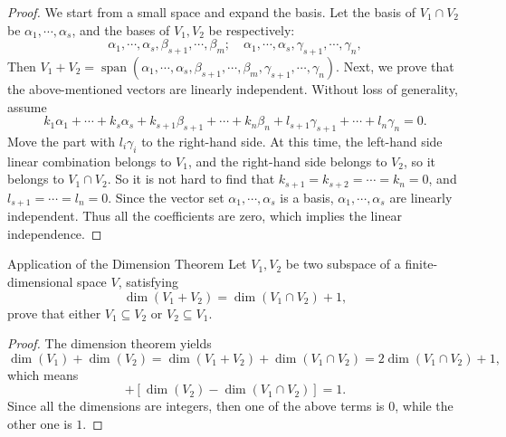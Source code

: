 \begin{proof}
  We start from a small space and expand the basis.
  Let the basis of $V_1 \cap V_2$ be $\alpha_1,\cdots,\alpha_s$,
  and the bases of $V_1, V_2$ be respectively:
  \begin{equation}
    \alpha_1,\cdots,\alpha_s,\beta_{s+1},\cdots,\beta_m; \quad 
    \alpha_1,\cdots,\alpha_s,\gamma_{s+1},\cdots,\gamma_n,
  \end{equation}
  Then $V_1 + V_2 = \operatorname{span}(\alpha_1,\cdots,\alpha_s,\beta_{s+1},\cdots,\beta_m,\gamma_{s+1},\cdots,\gamma_n)$.
  Next, we prove that the above-mentioned vectors are linearly independent.
  Without loss of generality, assume
  \begin{equation}
    k_1\alpha_1+\cdots+k_s\alpha_s+k_{s+1}\beta_{s+1}+\cdots+k_n\beta_n+l_{s+1}\gamma_{s+1}+\cdots+l_n\gamma_n=0.
  \end{equation}
  Move the part with $l_i \gamma_i$ to the right-hand side.
  At this time, the left-hand side linear combination belongs to $V_1$,
  and the right-hand side belongs to $V_2$,
  so it belongs to $V_1 \cap V_2$.
  So it is not hard to find that $k_{s+1} = k_{s+2} = \cdots = k_n = 0$,
  and $l_{s+1} = \cdots = l_n = 0$.
  Since the vector set $\alpha_1, \cdots, \alpha_s$ is a basis,
  $\alpha_1,\cdots,\alpha_s$ are linearly independent. Thus all the coefficients are zero,
  which implies the linear independence.
\end{proof}

\begin{example}{Application of the Dimension Theorem}{}
  Let $V_1, V_2$ be two subspace of a finite-dimensional space $V$,
  satisfying
  \begin{equation}
    \operatorname{dim}(V_1 + V_2) = \operatorname{dim}(V_1 \cap V_2) + 1,
  \end{equation}
  prove that either $V_1 \subseteq V_2$ or $V_2 \subseteq V_1$.
\end{example}

\begin{proof}
  The dimension theorem yields
  \begin{equation}
    \operatorname{dim}(V_1) + \operatorname{dim}(V_2)
    = \operatorname{dim}(V_1 + V_2) + \operatorname{dim}(V_1 \cap V_2)
    = 2 \operatorname{dim}(V_1 \cap V_2) + 1,
  \end{equation}
  which means
  \begin{equation}
    [\operatorname{dim}(V_1) - \operatorname{dim}(V_1 \cap V_2)]
    + [\operatorname{dim}(V_2) - \operatorname{dim}(V_1 \cap V_2)] = 1.
  \end{equation}
  Since all the dimensions are integers,
  then one of the above terms is $0$, while the other one is $1$.
\end{proof}


